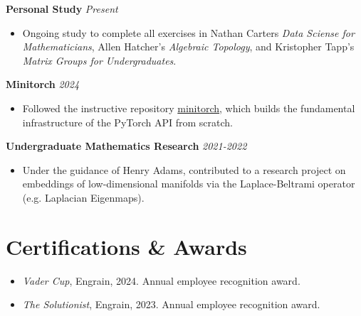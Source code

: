 \documentclass[a4paper,10pt]{article}
\newcommand{\resumeEntry}[2]{%
  \noindent\textbf{#1} \hfill \textit{#2}\par\vspace{-0.5ex}%
}
\begin{document}
\resumeEntry{Personal Study}{Present}
\begin{itemize}[leftmargin=*, noitemsep]
    \item Ongoing study to complete all exercises in Nathan Carters \textit{Data Sciense for Mathematicians},
    Allen Hatcher's \textit{Algebraic Topology}, and Kristopher Tapp's \textit{Matrix Groups for Undergraduates}.
\end{itemize}

\resumeEntry{Minitorch}{2024}
\begin{itemize}[leftmargin=*, noitemsep]
    \item Followed the instructive repository \href{https://minitorch.github.io/}{minitorch}, which builds the 
    fundamental infrastructure of the PyTorch API from scratch.
\end{itemize}

\resumeEntry{Undergraduate Mathematics Research}{2021-2022}
\begin{itemize}[leftmargin=*, noitemsep]
    \item Under the guidance of Henry Adams, contributed to a research project on embeddings of low-dimensional manifolds 
    via the Laplace-Beltrami operator (e.g. Laplacian Eigenmaps).
\end{itemize}

\section*{Certifications \& Awards}
\begin{itemize}[leftmargin=*, noitemsep]
    \item \textit{Vader Cup}, Engrain, 2024. 
    Annual employee recognition award.
    \item \textit{The Solutionist}, Engrain, 2023. 
    Annual employee recognition award.
\end{itemize}
\end{document}
